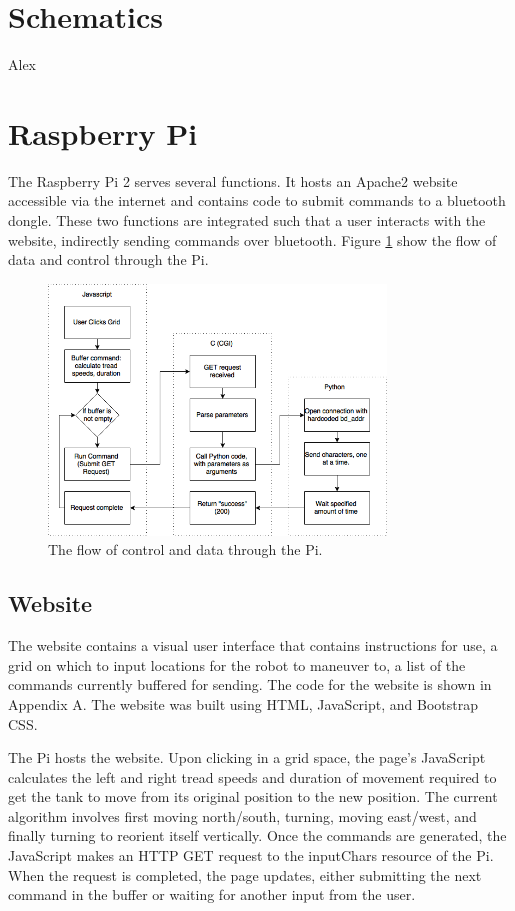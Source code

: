 \documentclass[12pt]{article}
\begin{document}
\section{Schematics}
Alex
\section{Raspberry Pi}

The Raspberry Pi 2 serves several functions. It hosts an Apache2 website accessible via the internet and contains code to submit commands to a bluetooth dongle. These two functions are integrated such that a user interacts with the website, indirectly sending commands over bluetooth. Figure \ref{fig:piroutines} show the flow of data and control through the Pi.

\begin{figure}
\begin{center}
\includegraphics[width=0.8\textwidth]{PiRoutines}
\end{center}
\caption{The flow of control and data through the Pi.}
\label{fig:piroutines}
\end{figure}

\subsection{Website}

The website contains a visual user interface that contains instructions for use, a grid on which to input locations for the robot to maneuver to, a list of the commands currently buffered for sending. The code for the website is shown in Appendix A. The website was built using HTML, JavaScript, and Bootstrap CSS. 

The Pi hosts the website. Upon clicking in a grid space, the page's JavaScript calculates the left and right tread speeds and duration of movement required to get the tank to move from its original position to the new position. The current algorithm involves first moving north/south, turning, moving east/west, and finally turning to reorient itself vertically. Once the commands are generated, the JavaScript makes an HTTP GET request to the inputChars resource of the Pi. When the request is completed, the page updates, either submitting the next command in the buffer or waiting for another input from the user.
\end{document}
